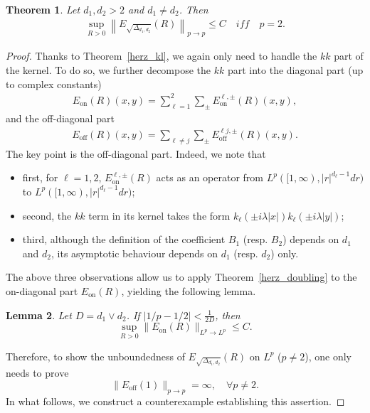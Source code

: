 \documentclass[12pt]{amsart}
\newcommand\Lapd{\Delta_{d_1, d_2}}
\newtheorem{theorem}{Theorem}[section]
\newtheorem{lemma}[theorem]{Lemma}
\begin{document}
  \begin{theorem}\label{fefferman_nondoubling}
Let $d_1,d_2>2$ and $d_1 \ne d_2$. Then
\begin{align*}
    \sup_{R>0} \left\| E_{\sqrt{\Lapd}}(R) \right\|_{p \to p} \le C \quad \textit{iff} \quad p=2.
\end{align*}

\end{theorem}


\begin{proof}
Thanks to Theorem~\ref{herz_kl}, we again only need to handle the $kk$ part of the kernel. To do so, we further decompose the $kk$ part into the diagonal part (up to complex constants)
\begin{align*}
    E_{\mathrm{on}}(R)(x,y) = \sum_{\ell=1}^2 \sum_{\pm} E_{\mathrm{on}}^{\ell,\pm}(R)(x,y),
\end{align*}
and the off-diagonal part
\begin{align*}
    E_{\mathrm{off}}(R)(x,y) = \sum_{\ell \ne j} \sum_{\pm} E_{\mathrm{off}}^{\ell j, \pm}(R)(x,y).
\end{align*}
The key point is the off-diagonal part. Indeed, we note that 
\begin{itemize}
    \item first, for $\ell=1,2$, $E_{\mathrm{on}}^{\ell,\pm}(R)$ acts as an operator from $L^p([1,\infty),|r|^{d_\ell-1} dr)$ to $L^p([1,\infty),|r|^{d_\ell-1} dr)$;
    \item second, the $kk$ term in its kernel takes the form $k_\ell(\pm i\lambda|x|)k_\ell(\pm i\lambda|y|)$;
    \item third, although the definition of the coefficient $B_1$ (resp. $B_2$) depends on $d_1$ and $d_2$, its asymptotic behaviour depends on $d_1$ (resp. $d_2$) only. 
\end{itemize}
The above three observations allow us to apply Theorem~\ref{herz_doubling} to the on-diagonal part $E_{\mathrm{on}}(R)$, yielding the following lemma.



\begin{lemma}\label{fefferman-on-diag}
Let \(D=d_1\vee d_2\). If
\(\left|1/p-1/2\right|<\frac1{2D}\), then
\[
\sup_{R>0}\|E_{\mathrm{on}}(R)\|_{L^p\to L^p}\leq C.
\]
\end{lemma}

Therefore, to show the unboundedness of $E_{\sqrt{\Lapd}}(R)$ on $L^p$ ($p\ne 2$), one only needs to prove
\begin{equation}\label{claim}
    \| E_{\mathrm{off}}(1)\|_{p \to p} = \infty,\quad \forall p\ne 2.
\end{equation}
In what follows,
we construct a counterexample establishing this assertion.


\end{proof}
\end{document}
